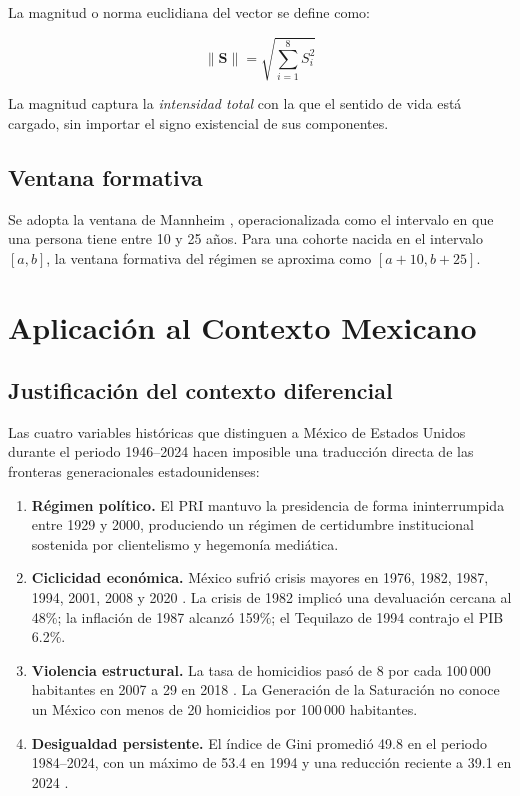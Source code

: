 \documentclass[conference,spanish]{IEEEtran}
\begin{document}
La magnitud o norma euclidiana del vector se define como:

\begin{equation}
\|\mathbf{S}\| = \sqrt{\sum_{i=1}^{8} S_i^{2}}
\end{equation}

La magnitud captura la \textit{intensidad total} con la que el sentido de vida está cargado, sin importar el signo existencial de sus componentes.

\subsection{Ventana formativa}

Se adopta la ventana de Mannheim \cite{mannheim1928}, operacionalizada como el intervalo en que una persona tiene entre 10 y 25 años. Para una cohorte nacida en el intervalo $[a, b]$, la ventana formativa del régimen se aproxima como $[a + 10, b + 25]$.

\section{Aplicación al Contexto Mexicano}
\label{sec:mexico}

\subsection{Justificación del contexto diferencial}

Las cuatro variables históricas que distinguen a México de Estados Unidos durante el periodo 1946--2024 hacen imposible una traducción directa de las fronteras generacionales estadounidenses:

\begin{enumerate}
  \item \textbf{Régimen político.} El PRI mantuvo la presidencia de forma ininterrumpida entre 1929 y 2000, produciendo un régimen de certidumbre institucional sostenida por clientelismo y hegemonía mediática.
  \item \textbf{Ciclicidad económica.} México sufrió crisis mayores en 1976, 1982, 1987, 1994, 2001, 2008 y 2020 \cite{banxico2024}. La crisis de 1982 implicó una devaluación cercana al 48\%; la inflación de 1987 alcanzó 159\%; el Tequilazo de 1994 contrajo el PIB 6.2\%.
  \item \textbf{Violencia estructural.} La tasa de homicidios pasó de 8 por cada 100\,000 habitantes en 2007 a 29 en 2018 \cite{inegi2024homicidios}. La Generación de la Saturación no conoce un México con menos de 20 homicidios por 100\,000 habitantes.
  \item \textbf{Desigualdad persistente.} El índice de Gini promedió 49.8 en el periodo 1984--2024, con un máximo de 53.4 en 1994 y una reducción reciente a 39.1 en 2024 \cite{worldbank2024}.
\end{enumerate}
\end{document}
